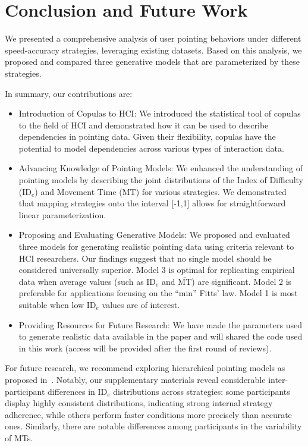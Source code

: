 \documentclass[manuscript,review,anonymous]{acmart}
\newcommand{\mmt}{\ensuremath{\overline{\text{MT}}}\xspace}
\newcommand{\ide}{\ensuremath{{\text{ID}_e}}\xspace}
\begin{document}
\section{Conclusion and Future Work}
We presented a comprehensive analysis of user pointing behaviors under different speed-accuracy strategies, leveraging existing datasets. Based on this analysis, we proposed and compared three generative models that are parameterized by these strategies.


In summary, our contributions are:
\begin{itemize}
	\item Introduction of Copulas to HCI: We introduced the statistical tool of copulas to the field of HCI and demonstrated how it can be used to describe dependencies in pointing data. Given their flexibility, copulas have the potential to model dependencies across various types of interaction data.
	\item Advancing Knowledge of Pointing Models: We enhanced the understanding of pointing models by describing the joint distributions of the Index of Difficulty (\ide) and Movement Time (MT) for various strategies. We demonstrated that mapping strategies onto the interval [-1,1] allows for straightforward linear parameterization.
	\item Proposing and Evaluating Generative Models: We proposed and evaluated three models for generating realistic pointing data using criteria relevant to HCI researchers. Our findings suggest that no single model should be considered universally superior. Model 3 is optimal for replicating empirical data when average values (such as \ide and \mmt) are significant. Model 2 is preferable for applications focusing on the ``min'' Fitts' law. Model 1 is most suitable when low \ide values are of interest.
	\item Providing Resources for Future Research: We have made the parameters used to generate realistic data available in the paper and will shared the code used in this work (access will be provided after the first round of reviews).
\end{itemize}


For future research, we recommend exploring hierarchical pointing models as proposed in~\cite{zhao2022}. Notably, our supplementary materials reveal considerable inter-participant differences in \ide distributions across strategies: some participants display highly consistent distributions, indicating strong internal strategy adherence, while others perform faster conditions more precisely than accurate ones. Similarly, there are notable differences among participants in the variability of MTs.
\end{document}

